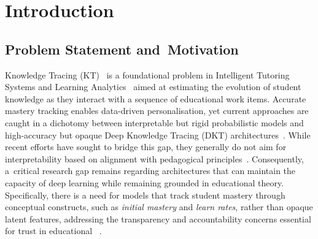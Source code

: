 \documentclass[applsci,article,accept,moreauthors,pdftex]{Definitions/mdpi}
\begin{document}

\section{Introduction} \label{sec_intro}
\unskip


\subsection{Problem Statement and~Motivation}

{Knowledge Tracing (KT)~\citep{corbett1994knowledge} is a foundational problem in Intelligent Tutoring Systems and Learning Analytics~\citep{Romero2020} aimed at estimating the evolution of student knowledge as they interact with a sequence of educational work items. Accurate mastery tracking enables data-driven personalisation, yet current approaches are caught in a dichotomy between interpretable but rigid probabilistic models and high-accuracy but opaque Deep Knowledge Tracing (DKT) architectures~\citep{abdelrahman2023knowledge, twenty_five_years_of_bkt, vaswani2017attention}. While recent efforts have sought to bridge this gap, they generally do not aim for interpretability based on alignment with pedagogical principles~\citep{bai2024survey, rudin2019stop, vonrueden2021informed}. Consequently, a~critical research gap remains regarding architectures that can maintain the capacity of deep learning while remaining grounded in educational theory. Specifically, there is a need for models that track student mastery through conceptual constructs, such as \textit{initial mastery} and \textit{learn rates}, rather than opaque latent features, addressing the transparency and accountability concerns essential for trust in educational ~\citep{Holmes2022504}}.
\end{document}
